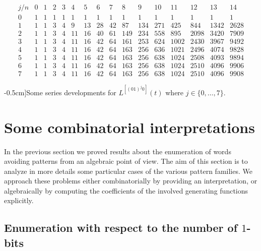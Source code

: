 \begin{table}
\begin{equation*}\begin{array}{c|ccccccccccccccc}j/n & 0 & 1 & 2 & 3 & 4 & 5 & 6 & 7 & 8 & 9 & 10 & 11 & 12 & 13 & 14\\\hline0 & 1 & 1 & 1 & 1 & 1 & 1 & 1 & 1 & 1 & 1 & 1 & 1 & 1 & 1 & 1\\1 & 1 & 1 & 3 & 4 & 9 & 13 & 28 & 42 & 87 & 134 & 271 & 425 & 844 & 1342 & 2628\\2 & 1 & 1 & 3 & 4 & 11 & 16 & 40 & 61 & 149 & 234 & 558 & 895 & 2098 & 3420 & 7909\\3 & 1 & 1 & 3 & 4 & 11 & 16 & 42 & 64 & 161 & 253 & 624 & 1002 & 2430 & 3967 & 9492\\4 & 1 & 1 & 3 & 4 & 11 & 16 & 42 & 64 & 163 & 256 & 636 & 1021 & 2496 & 4074 & 9828\\5 & 1 & 1 & 3 & 4 & 11 & 16 & 42 & 64 & 163 & 256 & 638 & 1024 & 2508 & 4093 & 9894\\6 & 1 & 1 & 3 & 4 & 11 & 16 & 42 & 64 & 163 & 256 & 638 & 1024 & 2510 & 4096 & 9906\\7 & 1 & 1 & 3 & 4 & 11 & 16 & 42 & 64 & 163 & 256 & 638 & 1024 & 2510 & 4096 & 9908\end{array}\end{equation*}
\caption[][-0.5cm]{Some series developments for $L^{[(01)^{j}0]}(t)$ where $j\in \lbrace 0,\ldots,7 \rbrace$.}
\label{tbl:L01_j:0}
\end{table}




\section{Some combinatorial interpretations}

In the previous section we proved results about the enumeration of words
avoiding patterns from an algebraic point of view. The aim of this section is
to analyze in more details some particular cases of the various pattern
families. We approach these problems either combinatorially by providing an interpretation, or algebraically by
computing the coefficients of the involved generating functions explicitly.

\subsection{Enumeration with respect to the number of $1$-bits}

